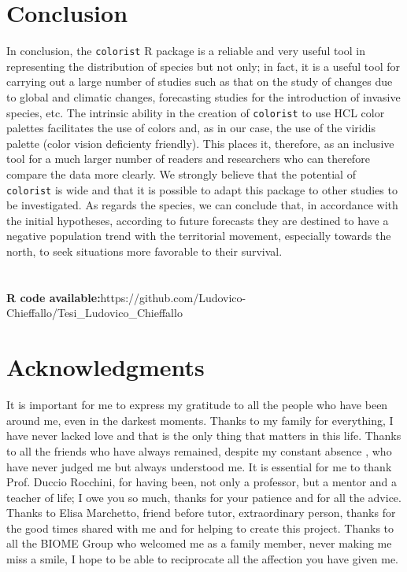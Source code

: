 \documentclass[12pt,a4paper]{article}
\begin{document}
\section{Conclusion}
In conclusion, the \texttt{colorist} R package is a reliable and very useful tool in representing the distribution of species but not only; in fact, it is a useful tool for carrying out a large number of studies such as that on the study of changes due to global and climatic changes, forecasting studies for the introduction of invasive species, etc.
The intrinsic ability in the creation of \texttt{colorist} to use HCL color palettes facilitates the use of colors and, as in our case, the use of the viridis palette (color vision deficienty friendly).
This places it, therefore, as an inclusive tool for a much larger number of readers and researchers who can therefore compare the data more clearly.
We strongly believe that the potential of \texttt{colorist} is wide and that it is possible to adapt this package to other studies to be investigated.
As regards the species, we can conclude that, in accordance with the initial hypotheses, according to future forecasts they are destined to have a negative population trend with the territorial movement, especially towards the north, to seek situations more favorable to their survival.
\\
\\
\\
\bigskip
\textbf{R code available:}https://github.com/Ludovico-Chieffallo/Tesi\_Ludovico\_Chieffallo

\section{Acknowledgments}
It is important for me to express my gratitude to all the people who have been around me, even in the darkest moments. Thanks to my family for everything, I have never lacked love and that is the only thing that matters in this life. Thanks to all the friends who have always remained, despite my constant absence , who have never judged me but always understood me. It is essential for me to thank Prof. Duccio Rocchini, for having been, not only a professor, but a mentor and a teacher of life; I owe you so much, thanks for your patience and for all the advice. Thanks to Elisa Marchetto, friend before tutor, extraordinary person, thanks for the good times shared with me and for helping to create this project. Thanks to all the BIOME Group who welcomed me as a family member, never making me miss a smile, I hope to be able to reciprocate all the affection you have given me.
\end{document}
